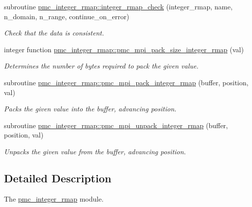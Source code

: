 \begin{DoxyCompactItemize}
subroutine \mbox{\hyperlink{namespacepmc__integer__rmap_ada6b75ea8b1fbe6d86029e707fa4dcaa}{pmc\+\_\+integer\+\_\+rmap\+::integer\+\_\+rmap\+\_\+check}} (integer\+\_\+rmap, name, n\+\_\+domain, n\+\_\+range, continue\+\_\+on\+\_\+error)
\begin{DoxyCompactList}\small\item\em Check that the data is consistent. \end{DoxyCompactList}\item 
integer function \mbox{\hyperlink{namespacepmc__integer__rmap_abea71acd80972ef2286adaf3a124b1c0}{pmc\+\_\+integer\+\_\+rmap\+::pmc\+\_\+mpi\+\_\+pack\+\_\+size\+\_\+integer\+\_\+rmap}} (val)
\begin{DoxyCompactList}\small\item\em Determines the number of bytes required to pack the given value. \end{DoxyCompactList}\item 
subroutine \mbox{\hyperlink{namespacepmc__integer__rmap_a3fe52c5b53b166a04a637aa40a1250ef}{pmc\+\_\+integer\+\_\+rmap\+::pmc\+\_\+mpi\+\_\+pack\+\_\+integer\+\_\+rmap}} (buffer, position, val)
\begin{DoxyCompactList}\small\item\em Packs the given value into the buffer, advancing position. \end{DoxyCompactList}\item 
subroutine \mbox{\hyperlink{namespacepmc__integer__rmap_a3603985157c28d502225dd090ff2f44a}{pmc\+\_\+integer\+\_\+rmap\+::pmc\+\_\+mpi\+\_\+unpack\+\_\+integer\+\_\+rmap}} (buffer, position, val)
\begin{DoxyCompactList}\small\item\em Unpacks the given value from the buffer, advancing position. \end{DoxyCompactList}\end{DoxyCompactItemize}


\subsection{Detailed Description}
The \mbox{\hyperlink{namespacepmc__integer__rmap}{pmc\+\_\+integer\+\_\+rmap}} module. 

